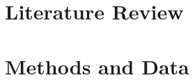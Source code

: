\documentclass[edeposit,fullpage,11pt]{uiucthesis2018}
\title{\pygen}
\author{Samuel G. Dotson}
\begin{document}
\maketitle
%
\frontmatter
\begin{abstract}

Abstract.

\end{abstract}

%
%
%
%
\tableofcontents
\listoftables
\listoffigures
%
%
\pagebreak
\mainmatter
%
% 
%
\chapter{Literature Review}


\chapter{Methods and Data}
\label{chapter:methods}

\end{document}
